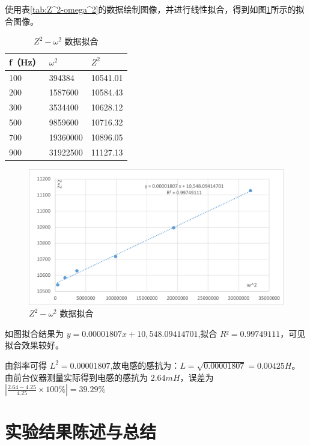 \documentclass[a4paper]{../phyreport}
\begin{document}
使用表\ref{tab:Z^2-omega^2}的数据绘制图像，并进行线性拟合，得到如图\ref{fig:Z^2-omega^2}所示的拟合图像。
\begin{table}[H]
  \begin{minipage}{0.5\linewidth}
  \centering
  \caption{$Z^2-\omega^2$ 数据}
  \label{tab:Z^2-omega^2}
  \begin{tabular}{lll}
    \hline
    f（Hz） & $\omega^2$       & $Z^2$        \\ \hline
    100   & 394384   & 10541.01 \\
    200   & 1587600  & 10584.43 \\
    300   & 3534400  & 10628.12 \\
    500   & 9859600  & 10716.32 \\
    700   & 19360000 & 10896.05 \\
    900   & 31922500 & 11127.13 \\ \hline
    \end{tabular}
  \end{minipage}
  \begin{minipage}{0.48\linewidth}
    \begin{figure}[H]
      \centering
      \includegraphics[width=0.95\columnwidth]{./fig/Z^2-omega^2.png}
      \caption{$Z^2-\omega^2$ 数据拟合}
      \label{fig:Z^2-omega^2}
    \end{figure}
  \end{minipage}
\end{table}

如图拟合结果为 $y = 0.00001807 x + 10,548.09414701$,拟合 $R² = 0.99749111$，可见拟合效果较好。

由斜率可得 $L^2 = 0.00001807$,故电感的感抗为：$L=\sqrt{0.00001807}=0.00425H$。由前台仪器测量实际得到电感的感抗为 $2.64mH$，误差为$|\frac{2.64-4.25}{4.25}\times 100\%| = 39.29\%$

\longLine  
\section{实验结果陈述与总结}
\end{document}
